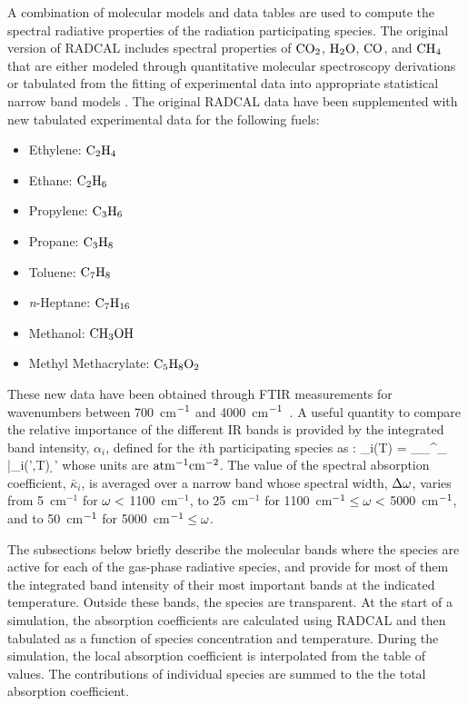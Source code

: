 A combination of molecular models and data tables are used to compute the spectral radiative properties of the radiation participating species. The original version of RADCAL includes spectral properties of $\rm CO_2$, $\rm H_2O$, $\rm CO$, and $\rm CH_4$ that are either modeled through quantitative molecular spectroscopy derivations or tabulated from the fitting of experimental data into appropriate statistical narrow band models \cite{RadCal}. The original RADCAL data have been supplemented with new tabulated experimental data for the following fuels:
\begin{itemize}
  \item Ethylene:  $\rm C_2H_4$
  \item Ethane:    $\rm C_2H_6$
  \item Propylene: $\rm C_3H_6$
  \item Propane:   $\rm C_3H_8$
  \item Toluene:   $\rm C_7H_8$
  \item \textit{n}-Heptane: $\rm C_7H_{16}$
  \item Methanol:  $\rm CH_3OH$
  \item Methyl Methacrylate: $\rm C_5H_8O_2$
\end{itemize}
These new data have been obtained through FTIR measurements for wavenumbers between 700~cm$\rm ^{-1}$ and 4000~cm$\rm ^{-1}$~\cite{Wakatsuki:2005}. A useful quantity to compare the relative importance of the different IR bands is provided by the integrated band intensity, $\alpha_i$, defined for the $i$th participating species as \cite{Matheson:1932}:
\be
  \alpha_i(T) = \displaystyle\int_{\om_{\min}}^{\om_{\max}} \bar{\kappa}_i(\om',T) \; \d \om'
\ee
whose units are $\rm {atm^{-1} cm^{-2}}$. The value of the spectral absorption coefficient, $\bar{\kappa}_i$, is averaged over a narrow band whose spectral width, $\Delta \omega$, varies from 5~cm$^{-1}$ for $\omega < $ 1100~cm$^{-1}$, to 25~cm$^{-1}$ for 1100~cm$^{-1} \leq \omega < $ 5000~cm$^{\rm -1}$, and to 50~cm$^{\rm -1}$ for 5000~cm$^{\rm -1}\leq \omega$.

The subsections below briefly describe the molecular bands where the species are active for each of the gas-phase radiative species, and provide for most of them the integrated band intensity of their most important bands at the indicated temperature. Outside these bands, the species are transparent. At the start of a simulation, the absorption coefficients are calculated using RADCAL and then tabulated as a function of species concentration and temperature. During the simulation, the local absorption coefficient is interpolated from the table of values. The contributions of individual species are summed to the the total absorption coefficient.



